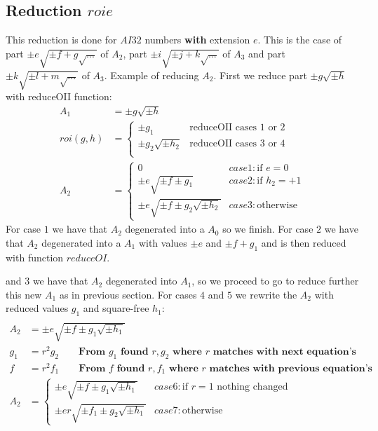 \documentclass{article}
\begin{document}
\subsection{Reduction $roie$}
This reduction is done for $AI32$ numbers \textbf{with} extension $e$. This is the case of 
part $\pm e\sqrt{\pm f + g\sqrt{...}}$ of $A_2$,
part $\pm i\sqrt{\pm j + k\sqrt{...}}$ of $A_3$ and
part $\pm k\sqrt{\pm l + m\sqrt{...}}$ of $A_3$.
Example of reducing $A_2$. First we reduce part $\pm g\sqrt{\pm h}$ with reduceOII 
function:
\begin{align}
A_1 &= \pm g\sqrt{\pm h}\\
roi(g,h) &= \begin{cases}
 \pm g_1               &\text{reduceOII cases 1 or 2}\\
 \pm g_2\sqrt{\pm h_2} &\text{reduceOII cases 3 or 4}\\
\end{cases}\\
A_2 &= \begin{cases}
 0                                       &case 1: \text{if } e = 0\\
 \pm e\sqrt{\pm f \pm g_1}               &case 2: \text{if } h_2 = +1\\
 \pm e\sqrt{\pm f \pm g_2\sqrt{\pm h_2}} &case 3: \text{otherwise }
\end{cases}
\end{align}
For case $1$ we have that $A_2$ degenerated into a $A_0$ so we finish.
For case $2$ we have that $A_2$ degenerated into a $A_1$ with values
$\pm e$ and $\pm f+g_1$ and is then reduced with function $reduceOI$.


and $3$ we have that $A_2$ degenerated into $A_1$, so we proceed to go
to reduce further this new $A_1$ as in previous section. For cases $4$ and $5$ we rewrite
the $A_2$ with reduced values $g_1$ and square-free $h_1$:
\begin{align}\\
A_2 &= \pm e\sqrt{\pm f \pm g_1\sqrt{\pm h_1}}\\
g_1 &= r^2g_2 \qquad \textbf{From $g_1$ found $r,g_2$ where $r$ matches with next equation's}\\
f   &= r^2f_1 \qquad \textbf{From $f$ found $r,f_1$ where $r$ matches with previous equation's}\\
A_2 &= \begin{cases}
 \pm e\sqrt{\pm f \pm g_1\sqrt{\pm h_1}} &case 6: \text{if } r = 1 \text{ nothing changed}\\
 \pm er\sqrt{\pm f_1 \pm g_2\sqrt{\pm h_1}}  &case 7: \text{otherwise }
\end{cases}
\end{align}
\end{document}
